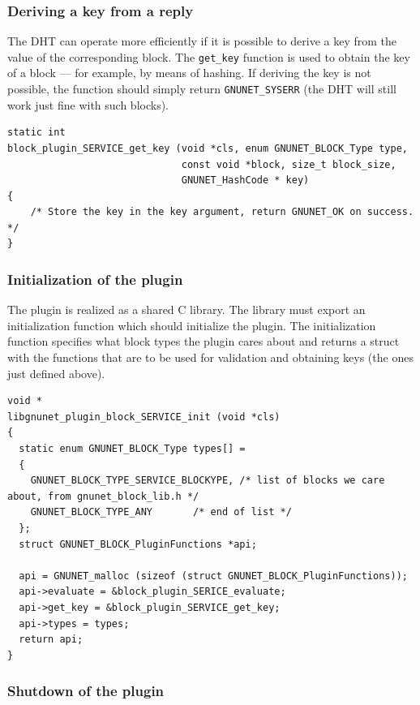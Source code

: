 \documentclass[10pt]{article}
\begin{document}
\subsubsection{Deriving a key from a reply}

The DHT can operate more efficiently if it is possible to derive a key
from the value of the corresponding block.  The {\tt get\_key}
function is used to obtain the key of a block --- for example, by
means of hashing.  If deriving the key is not possible, the function
should simply return {\tt GNUNET\_SYSERR} (the DHT will still work
just fine with such blocks).

\lstset{language=C}
\begin{lstlisting}
static int
block_plugin_SERVICE_get_key (void *cls, enum GNUNET_BLOCK_Type type,
                              const void *block, size_t block_size,
                              GNUNET_HashCode * key)
{
    /* Store the key in the key argument, return GNUNET_OK on success. */
}
\end{lstlisting}

\subsubsection{Initialization of the plugin}

The plugin is realized as a shared C library.  The library must export
an initialization function which should initialize the plugin.  The
initialization function specifies what block types the plugin cares
about and returns a struct with the functions that are to be used for
validation and obtaining keys (the ones just defined above).

\lstset{language=C}
\begin{lstlisting}
void *
libgnunet_plugin_block_SERVICE_init (void *cls)
{
  static enum GNUNET_BLOCK_Type types[] =
  {
    GNUNET_BLOCK_TYPE_SERVICE_BLOCKYPE, /* list of blocks we care about, from gnunet_block_lib.h */
    GNUNET_BLOCK_TYPE_ANY       /* end of list */
  };
  struct GNUNET_BLOCK_PluginFunctions *api;

  api = GNUNET_malloc (sizeof (struct GNUNET_BLOCK_PluginFunctions));
  api->evaluate = &block_plugin_SERICE_evaluate;
  api->get_key = &block_plugin_SERVICE_get_key;
  api->types = types;
  return api;
}
\end{lstlisting}

\subsubsection{Shutdown of the plugin}
\end{document}

